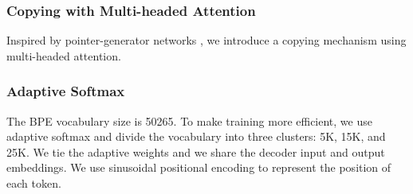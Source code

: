 \subsubsection{Copying with Multi-headed Attention}

Inspired by pointer-generator networks \cite{See2017GetTT}, we introduce
a copying mechanism using multi-headed attention.

\subsubsection{Adaptive Softmax}

The BPE vocabulary size is 50265. To make training more efficient, we use adaptive softmax
\cite{Grave2016EfficientSA} and divide the vocabulary into three clusters: 5K,
15K, and 25K. We tie the adaptive weights and we share the decoder input and
output embeddings. We use sinusoidal positional encoding
\cite{Vaswani2017AttentionIA} to represent the position of each token.
